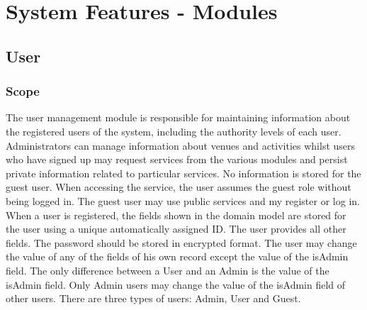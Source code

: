 \documentclass{article}
\begin{document}
\newpage
\section{System Features - Modules}

\subsection{User}
\subsubsection{Scope}
The user management module is responsible for maintaining information about the registered
users of the system, including the authority levels of each user. Administrators can
manage information about venues and activities whilst users who have signed up
may request services from the various modules and persist private information
related to particular services.\newline
No information is stored for the guest user. When accessing the service, the user
assumes the guest role without being logged in. The guest user may use public
services and my register or log in.
When a user is registered, the fields shown in the domain model are stored for the
user using a unique automatically assigned ID. The user provides all other fields. The
password should be stored in encrypted format. The user may change the value of
any of the fields of his own record except the value of the isAdmin field.
The only difference between a User and an Admin is the value of the isAdmin field.
Only Admin users may change the value of the isAdmin field of other users.
There are three types of users: Admin, User and Guest.
\end{document}
